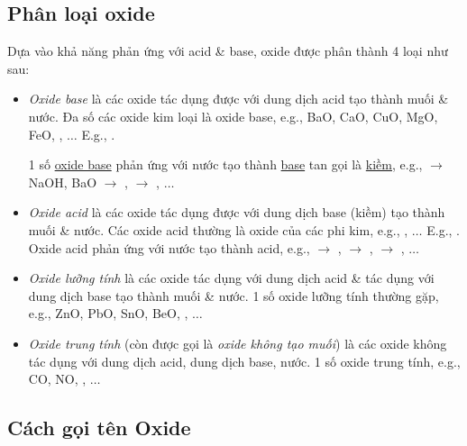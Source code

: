\documentclass{article}
\begin{document}
\subsection{Phân loại oxide}
Dựa vào khả năng phản ứng với acid \& base, oxide được phân thành 4 loại như sau:
\begin{itemize}
	\item \textit{Oxide base} là các oxide tác dụng được với dung dịch acid tạo thành muối \& nước. Đa số các oxide kim loại là oxide base, e.g., BaO, CaO, CuO, MgO, FeO, , $\ldots$ E.g., .
	
	1 số \href{https://vi.wikipedia.org/wiki/Oxide_base}{oxide base} phản ứng với nước tạo thành \href{https://vi.wikipedia.org/wiki/Base}{base} tan gọi là \href{https://vi.wikipedia.org/wiki/Ki%E1%BB%81m}{kiềm}, e.g., \ce{Na2O} $\to$ NaOH, BaO $\to$ \ce{Ba(OH)2}, \ce{Fe2O3} $\to$ \ce{Fe(OH)3}, $\ldots$
	\item \textit{Oxide acid} là các oxide tác dụng được với dung dịch base (kiềm) tạo thành muối \& nước. Các oxide acid thường là oxide của các phi kim, e.g., , $\ldots$ E.g., . Oxide acid phản ứng với nước tạo thành acid, e.g.,  $\to$ ,  $\to$ ,  $\to$ , $\ldots$
	\item \textit{Oxide lưỡng tính} là các oxide tác dụng với dung dịch acid \& tác dụng với dung dịch base tạo thành muối \& nước. 1 số oxide lưỡng tính thường gặp, e.g., ZnO, PbO, SnO, BeO, , $\ldots$
	\item \textit{Oxide trung tính} (còn được gọi là \textit{oxide không tạo muối}) là các oxide không tác dụng với dung dịch acid, dung dịch base, nước. 1 số oxide trung tính, e.g., CO, NO, , $\ldots$
\end{itemize}

\subsection{Cách gọi tên Oxide}
\end{document}
